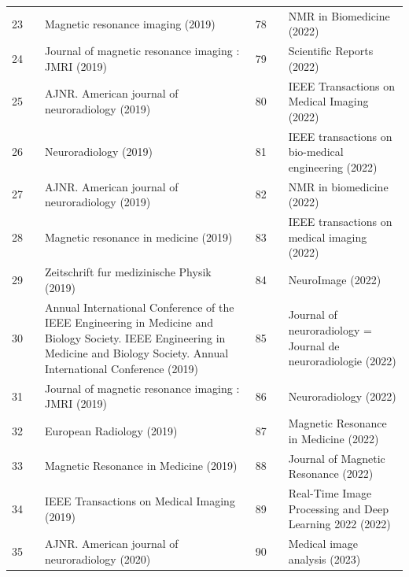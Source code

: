 \documentclass[11pt]{article}
\begin{document}
{\begin{longtable}{r l p{} r l p{}}
23 & \cite{zhao2019applications} & Magnetic resonance imaging (2019) & 78 & \cite{g2022quantitative} & NMR in Biomedicine (2022) \\
24 & \cite{sujit2019automated} & Journal of magnetic resonance imaging : JMRI (2019) & 79 & \cite{srikant2022quantitative} & Scientific Reports (2022) \\
25 & \cite{vranic2019compressed} & AJNR. American journal of neuroradiology (2019) & 80 & \cite{sui2022scanspecific} & IEEE Transactions on Medical Imaging (2022) \\
26 & \cite{glessgen2019evaluation} & Neuroradiology (2019) & 81 & \cite{hu2022spatiotemporal} & IEEE transactions on bio-medical engineering (2022) \\
27 & \cite{hagiwara2019improving} & AJNR. American journal of neuroradiology (2019) & 82 & \cite{pawar2022suppressing} & NMR in biomedicine (2022) \\
28 & \cite{haskell2019network} & Magnetic resonance in medicine (2019) & 83 & \cite{qiao2022unsupervised} & IEEE transactions on medical imaging (2022) \\
29 & \cite{bollmann2019sharqnet} & Zeitschrift fur medizinische Physik (2019) & 84 & \cite{almasni2022stacked} & NeuroImage (2022) \\
30 & \cite{elsaid2019superresolution} & Annual International Conference of the IEEE Engineering in Medicine and Biology Society. IEEE Engineering in Medicine and Biology Society. Annual International Conference (2019) & 85 & \cite{kanemaru2022effect} & Journal of neuroradiology = Journal de neuroradiologie (2022) \\
31 & \cite{ryu2019data} & Journal of magnetic resonance imaging : JMRI (2019) & 86 & \cite{kim2022deep} & Neuroradiology (2022) \\
32 & \cite{delattre2019compressed} & European Radiology (2019) & 87 & \cite{chan2022signal} & Magnetic Resonance in Medicine (2022) \\
33 & \cite{zhang2019mri} & Magnetic Resonance in Medicine (2019) & 88 & \cite{song2022jointly} & Journal of Magnetic Resonance (2022) \\
34 & \cite{zhang2019robust} & IEEE Transactions on Medical Imaging (2019) & 89 & \cite{wismuller2022selfsupervised} & Real-Time Image Processing and Deep Learning 2022 (2022) \\
35 & \cite{sommer2020correction} & AJNR. American journal of neuroradiology (2020) & 90 & \cite{gngr2023adaptive} & Medical image analysis (2023) \\

\end{longtable}}
\end{document}
